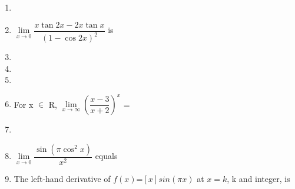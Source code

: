 \documentclass[journal,12pt,twocolumn]{IEEEtran}
\begin{document}
\begin{enumerate}
\item[~] \item $\lim\limits_{x \to 0}\dfrac{x \tan 2x-2x \tan x}{\left(1-\cos 2x\right)^2}$ is \item[~] \item[~]
\begin{itemize}
\end{itemize}

\item[~] \item For x $\in$ R, $\lim\limits_{x \to \infty}\left(\dfrac{x-3}{x+2}\right)^x$ =  \item[~] 
\begin{itemize}
\end{itemize}

\item $\lim\limits_{x \to 0}\dfrac{\sin(\pi\cos^2x)}{x^2}$ equals
\begin{itemize}
\end{itemize}

\item The left-hand derivative of $f(x)$=$[x]sin(\pi x)$ at $x\mathbin{=}k$, k and integer, is
\begin{itemize}
\end{itemize}


\end{enumerate}
\end{document}

